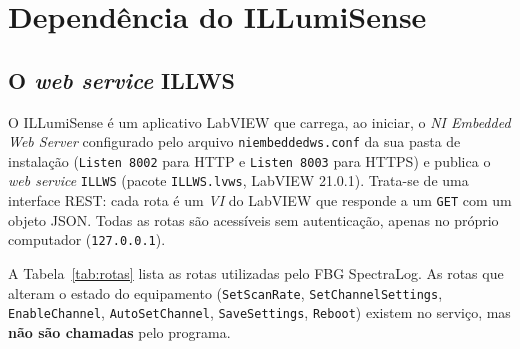 \documentclass[11pt,a4paper]{article}
\begin{document}
\section{Dependência do ILLumiSense}
\label{sec:dep}

\subsection{O \emph{web service} ILLWS}

O ILLumiSense é um aplicativo LabVIEW que carrega, ao iniciar, o \emph{NI Embedded Web Server}
configurado pelo arquivo \texttt{niembeddedws.conf} da sua pasta de instalação (\texttt{Listen 8002}
para HTTP e \texttt{Listen 8003} para HTTPS) e publica o \emph{web service} \texttt{ILLWS}
(pacote \texttt{ILLWS.lvws}, LabVIEW 21.0.1). Trata-se de uma interface REST: cada rota é um
\emph{VI} do LabVIEW que responde a um \texttt{GET} com um objeto JSON. Todas as rotas são
acessíveis sem autenticação, apenas no próprio computador (\texttt{127.0.0.1}).

A Tabela~\ref{tab:rotas} lista as rotas utilizadas pelo FBG SpectraLog. As rotas que alteram o
estado do equipamento (\texttt{SetScanRate}, \texttt{SetChannelSettings}, \texttt{EnableChannel},
\texttt{AutoSetChannel}, \texttt{SaveSettings}, \texttt{Reboot}) existem no serviço, mas
\textbf{não são chamadas} pelo programa.
\end{document}
